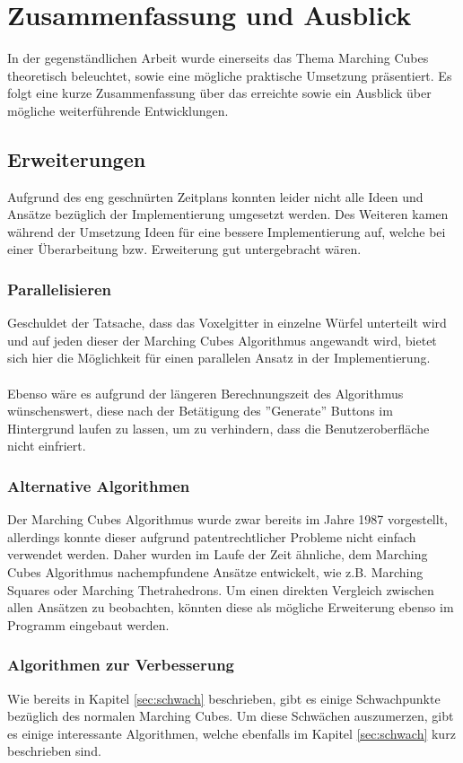 \chapter{Zusammenfassung und Ausblick}
In der gegenständlichen Arbeit wurde einerseits das Thema Marching Cubes theoretisch beleuchtet, sowie eine mögliche praktische Umsetzung präsentiert. Es folgt eine kurze Zusammenfassung über das erreichte sowie ein Ausblick über mögliche weiterführende Entwicklungen.

\section{Erweiterungen}
Aufgrund des eng geschnürten Zeitplans konnten leider nicht alle Ideen und Ansätze bezüglich der Implementierung umgesetzt werden. Des Weiteren kamen während der Umsetzung Ideen für eine bessere Implementierung auf, welche bei einer Überarbeitung bzw. Erweiterung gut untergebracht wären.

\subsection{Parallelisieren}
Geschuldet der Tatsache, dass das Voxelgitter in einzelne Würfel unterteilt wird und auf jeden dieser der Marching Cubes Algorithmus angewandt wird, bietet sich hier die Möglichkeit für einen parallelen Ansatz in der Implementierung.\\
\\
Ebenso wäre es aufgrund der längeren Berechnungszeit des Algorithmus wünschenswert, diese nach der Betätigung des ''Generate'' Buttons im Hintergrund laufen zu lassen, um zu verhindern, dass die Benutzeroberfläche nicht einfriert.
\subsection{Alternative Algorithmen}
Der Marching Cubes Algorithmus wurde zwar bereits im Jahre 1987 vorgestellt, allerdings konnte dieser aufgrund patentrechtlicher Probleme nicht einfach verwendet werden. Daher wurden im Laufe der Zeit ähnliche, dem Marching Cubes Algorithmus nachempfundene Ansätze entwickelt, wie z.B. Marching Squares oder Marching Thetrahedrons. Um einen direkten Vergleich zwischen allen Ansätzen zu beobachten, könnten diese als mögliche Erweiterung ebenso im Programm eingebaut werden.
\subsection{Algorithmen zur Verbesserung} 
Wie bereits in Kapitel \ref{sec:schwach} beschrieben, gibt es einige Schwachpunkte bezüglich des normalen Marching Cubes. Um diese Schwächen auszumerzen, gibt es einige interessante Algorithmen, welche ebenfalls im Kapitel \ref{sec:schwach} kurz beschrieben sind. 

